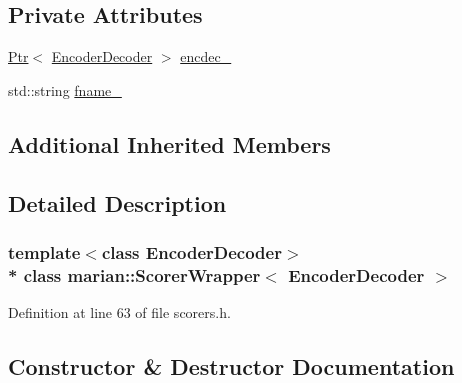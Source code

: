 \subsection*{Private Attributes}
\begin{DoxyCompactItemize}
\item 
\hyperlink{namespacemarian_ad1a373be43a00ef9ce35666145137b08}{Ptr}$<$ \hyperlink{classmarian_1_1EncoderDecoder}{Encoder\+Decoder} $>$ \hyperlink{classmarian_1_1ScorerWrapper_a5004443a8f1b1c1c3fc9f061035fac7c}{encdec\+\_\+}
\item 
std\+::string \hyperlink{classmarian_1_1ScorerWrapper_a6b6ff6dc3052ca52e9d8e66dadb46065}{fname\+\_\+}
\end{DoxyCompactItemize}
\subsection*{Additional Inherited Members}


\subsection{Detailed Description}
\subsubsection*{template$<$class Encoder\+Decoder$>$\\*
class marian\+::\+Scorer\+Wrapper$<$ Encoder\+Decoder $>$}



Definition at line 63 of file scorers.\+h.



\subsection{Constructor \& Destructor Documentation}

